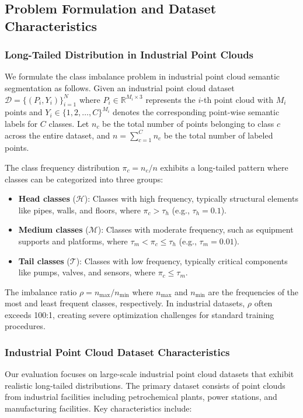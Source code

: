 \documentclass[preprint,12pt]{elsarticle}
\begin{document}
\subsection{Problem Formulation and Dataset Characteristics}
\label{sec:problem_formulation}

\subsubsection{Long-Tailed Distribution in Industrial Point Clouds}
We formulate the class imbalance problem in industrial point cloud semantic segmentation as follows. Given an industrial point cloud dataset $\mathcal{D} = \{(P_i, Y_i)\}_{i=1}^N$ where $P_i \in \mathbb{R}^{M_i \times 3}$ represents the $i$-th point cloud with $M_i$ points and $Y_i \in \{1, 2, \ldots, C\}^{M_i}$ denotes the corresponding point-wise semantic labels for $C$ classes. Let $n_c$ be the total number of points belonging to class $c$ across the entire dataset, and $n = \sum_{c=1}^C n_c$ be the total number of labeled points.

The class frequency distribution $\pi_c = n_c/n$ exhibits a long-tailed pattern where classes can be categorized into three groups:
\begin{itemize}
    \item \textbf{Head classes} ($\mathcal{H}$): Classes with high frequency, typically structural elements like pipes, walls, and floors, where $\pi_c > \tau_h$ (e.g., $\tau_h = 0.1$).
    \item \textbf{Medium classes} ($\mathcal{M}$): Classes with moderate frequency, such as equipment supports and platforms, where $\tau_m < \pi_c \leq \tau_h$ (e.g., $\tau_m = 0.01$).
    \item \textbf{Tail classes} ($\mathcal{T}$): Classes with low frequency, typically critical components like pumps, valves, and sensors, where $\pi_c \leq \tau_m$.
\end{itemize}

The imbalance ratio $\rho = n_{\max}/n_{\min}$ where $n_{\max}$ and $n_{\min}$ are the frequencies of the most and least frequent classes, respectively. In industrial datasets, $\rho$ often exceeds 100:1, creating severe optimization challenges for standard training procedures.

\subsubsection{Industrial Point Cloud Dataset Characteristics}
Our evaluation focuses on large-scale industrial point cloud datasets that exhibit realistic long-tailed distributions. The primary dataset consists of point clouds from industrial facilities including petrochemical plants, power stations, and manufacturing facilities. Key characteristics include:
\end{document}
